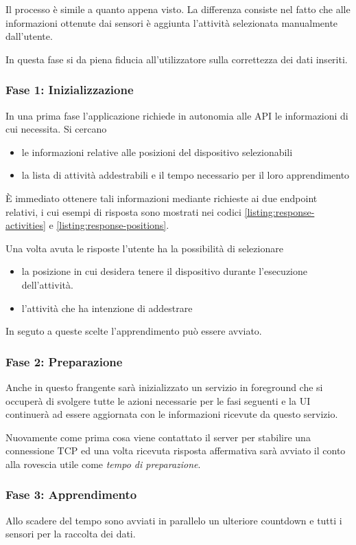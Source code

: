 Il processo è simile a quanto appena visto. La differenza consiste nel fatto che alle informazioni ottenute dai sensori è 
aggiunta l'attività selezionata manualmente dall'utente.

In questa fase si da piena fiducia all'utilizzatore sulla correttezza dei dati inseriti.

\subsubsection{Fase 1: Inizializzazione}
In una prima fase l'applicazione richiede in autonomia alle API le informazioni di cui necessita. Si cercano
\begin{itemize}
    \item le informazioni relative alle posizioni del dispositivo selezionabili
    \item la lista di attività addestrabili e il tempo necessario per il loro apprendimento
\end{itemize}
È immediato ottenere tali informazioni mediante richieste ai due endpoint relativi, i cui esempi di risposta sono mostrati nei codici 
\ref{listing:response-activities} e \ref{listing:response-positions}.

Una volta avuta le risposte l'utente ha la possibilità di selezionare 
\begin{itemize}
    \item la posizione in cui desidera tenere il dispositivo durante l'esecuzione dell'attività.
    \item l'attività che ha intenzione di addestrare
\end{itemize}
In seguto a queste scelte l'apprendimento può essere avviato.

\subsubsection{Fase 2: Preparazione}
Anche in questo frangente sarà inizializzato un servizio in foreground \cite{services} che si occuperà di svolgere 
tutte le azioni necessarie per le fasi seguenti e la UI continuerà ad essere aggiornata con le informazioni ricevute da questo servizio.

Nuovamente come prima cosa viene contattato il server per stabilire una connessione TCP ed una volta ricevuta risposta affermativa
sarà avviato il conto alla rovescia utile come \textit{tempo di preparazione}.

\subsubsection{Fase 3: Apprendimento}
Allo scadere del tempo sono avviati in parallelo un ulteriore countdown e tutti i sensori per la raccolta dei dati.

